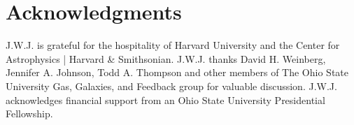 \documentclass[ms.tex]{subfiles}
\begin{document}
\section{Acknowledgments}
\label{sec:acknowledgments}

J.W.J. is grateful for the hospitality of Harvard University and the 
Center for Astrophysics | Harvard \& Smithsonian.
J.W.J. thanks David H. Weinberg, Jennifer A. Johnson, Todd A. Thompson and
other members of The Ohio State University Gas, Galaxies, and Feedback group
for valuable discussion.
J.W.J. acknowledges financial support from an Ohio State University
Presidential Fellowship.
\end{document}
